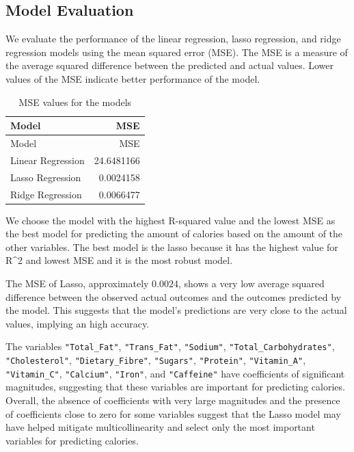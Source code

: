 \documentclass[
]{article}
\begin{document}
\subsection{Model Evaluation}\label{model-evaluation}

We evaluate the performance of the linear regression, lasso regression,
and ridge regression models using the mean squared error (MSE). The MSE
is a measure of the average squared difference between the predicted and
actual values. Lower values of the MSE indicate better performance of
the model.

\begin{longtable}[]{@{}lr@{}}
\caption{MSE values for the models}\tabularnewline
\toprule\noalign{}
Model & MSE \\
\midrule\noalign{}
\endfirsthead
\toprule\noalign{}
Model & MSE \\
\midrule\noalign{}
\endhead
\bottomrule\noalign{}
\endlastfoot
Linear Regression & 24.6481166 \\
Lasso Regression & 0.0024158 \\
Ridge Regression & 0.0066477 \\
\end{longtable}

We choose the model with the highest R-squared value and the lowest MSE
as the best model for predicting the amount of calories based on the
amount of the other variables. The best model is the lasso because it
has the highest value for R\^{}2 and lowest MSE and it is the most
robust model.

The MSE of Lasso, approximately \(0.0024\), shows a very low average
squared difference between the observed actual outcomes and the outcomes
predicted by the model. This suggests that the model's predictions are
very close to the actual values, implying an high accuracy.

The variables \texttt{"Total\_Fat"}, \texttt{"Trans\_Fat"},
\texttt{"Sodium"}, \texttt{"Total\_Carbohydrates"},
\texttt{"Cholesterol"}, \texttt{"Dietary\_Fibre"}, \texttt{"Sugars"},
\texttt{"Protein"}, \texttt{"Vitamin\_A"}, \texttt{"Vitamin\_C"},
\texttt{"Calcium"}, \texttt{"Iron"}, and \texttt{"Caffeine"} have
coefficients of significant magnitudes, suggesting that these variables
are important for predicting calories. Overall, the absence of
coefficients with very large magnitudes and the presence of coefficients
close to zero for some variables suggest that the Lasso model may have
helped mitigate multicollinearity and select only the most important
variables for predicting calories.
\end{document}
